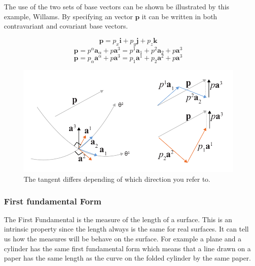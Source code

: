 The use of the two sets of base vectors can be shown be illustrated by this example, Willams. By specifying an vector $\textbf{p}$ it can be written in both contravariant and covariant base vectors.

\begin{equation}
    \textbf{p} = p_x \textbf{i} +p_y \textbf{j} +p_z \textbf{k}  
\end{equation}
\begin{equation}
    \textbf{p} = p^\alpha \textbf{a}_\alpha + p \textbf{a}^3 =   p^1 \textbf{a}_1 +  p^2 \textbf{a}_2 + p \textbf{a}^3 
\end{equation}
\begin{equation}
    \textbf{p} = p_\alpha \textbf{a}^\alpha + p \textbf{a}^3=  p_1 \textbf{a}^1 +  p_2 \textbf{a}^2 + p \textbf{a}^3   
\end{equation}


\begin{figure}[H]
\centering
\includegraphics[width=0.8\linewidth ]{figure/Theory/Covariant.pdf}
\caption{The tangent differs depending of which direction you refer to. }
\end{figure}




\subsubsection{First fundamental Form}

The First Fundamental is the measure of the length of a surface. This is an intrinsic property since the length always is the same for real surfaces. It can tell us how the measures will be behave on the surface. For example a plane and a cylinder has the same first fundamental form which means that  a line drawn on a paper has the same length as the curve on the folded cylinder by the same paper.

